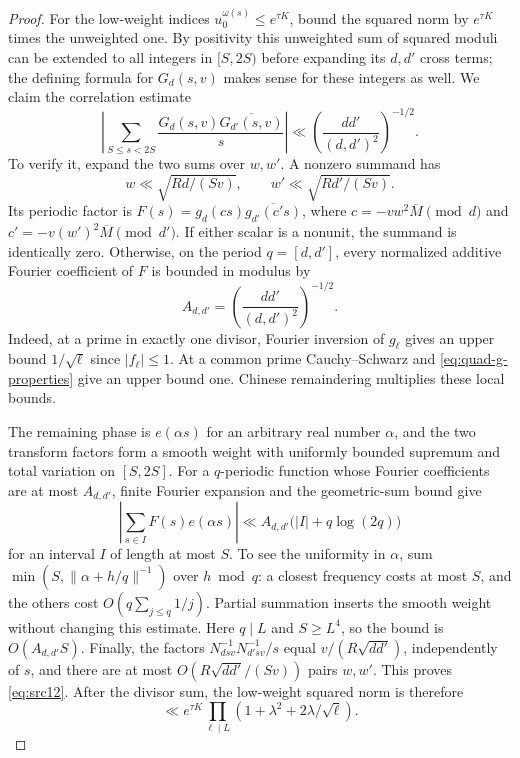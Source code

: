 \begin{proof}
For the low-weight indices $u_0^{\omega(s)}\leq e^{\tau K}$,
bound the squared norm by $e^{\tau K}$ times the unweighted one.
By positivity this unweighted sum of squared moduli can be extended
to all integers in $[S,2S)$ before expanding its $d,d'$ cross terms;
the defining formula for $G_d(s,v)$ makes sense for these integers
as well.  We claim the correlation estimate
\begin{equation}\label{eq:src12}
 \left|\sum_{S\leq s<2S}
       \frac{G_d(s,v)\overline{G_{d'}(s,v)}}s\right|
 \ll\left(\frac{dd'}{(d,d')^2}\right)^{-1/2}.
\end{equation}
To verify it, expand the two sums over $w,w'$.  A nonzero summand
has
\[
 w\ll\sqrt{Rd/(Sv)},\qquad
 w'\ll\sqrt{Rd'/(Sv)}.
\]
Its periodic factor is
$F(s)=g_d(cs)\overline{g_{d'}(c's)}$, where
$c=-vw^2\overline M\pmod d$ and
$c'=-v(w')^2\overline M\pmod{d'}$.
If either scalar is a nonunit, the summand is identically zero.
Otherwise, on the period $q=[d,d']$, every normalized additive
Fourier coefficient of $F$ is bounded in modulus by
\[
 A_{d,d'}=\left(\frac{dd'}{(d,d')^2}\right)^{-1/2}.
\]
Indeed, at a prime in exactly one divisor, Fourier inversion of
$g_\ell$ gives an upper bound $1/\sqrt\ell$ since $|f_\ell|\leq1$.
At a common prime Cauchy--Schwarz and
\eqref{eq:quad-g-properties} give an upper bound one.
Chinese remaindering multiplies these local bounds.

The remaining phase is $e(\alpha s)$ for an arbitrary real number
$\alpha$, and the two transform factors form a smooth weight with
uniformly bounded supremum and total variation on $[S,2S]$.
For a $q$-periodic function whose Fourier coefficients are at most
$A_{d,d'}$, finite Fourier expansion and the geometric-sum bound give
\[
 \left|\sum_{s\in I}F(s)e(\alpha s)\right|
 \ll A_{d,d'}\bigl(|I|+q\log(2q)\bigr)
\]
for an interval $I$ of length at most $S$.  To see the uniformity in
$\alpha$, sum
$\min(S,\|\alpha+h/q\|^{-1})$ over $h\bmod q$: a closest
frequency costs at most $S$, and the others cost
$O(q\sum_{j\leq q}1/j)$.  Partial summation inserts the smooth
weight without changing this estimate.  Here $q\mid L$ and
$S\geq L^4$, so the bound is $O(A_{d,d'}S)$.
Finally, the factors $N_{dsv}^{-1}N_{d'sv}^{-1}/s$ equal
$v/(R\sqrt{dd'})$, independently of $s$, and there are at most
$O(R\sqrt{dd'}/(Sv))$ pairs $w,w'$.  This proves
\eqref{eq:src12}.
After the divisor sum, the low-weight squared norm is therefore
\begin{equation}\label{eq:quad-low-weight}
 \ll e^{\tau K}
       \prod_{\ell\mid L}(1+\lambda^2+2\lambda/\sqrt\ell).
\end{equation}


\end{proof}
